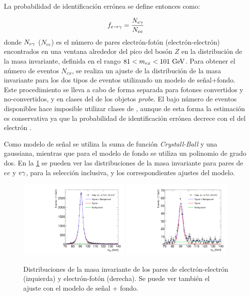 La probabilidad de identificación errónea {\feg} se define entonces como:

\begin{equation}\label{eq:efakerate}
  f_{e\rightarrow\gamma} = \frac{N_{e\gamma}}{N_{ee}}
\end{equation}
%
donde $N_{e\gamma}$ ($N_{ee}$) es el número de pares electrón-fotón
(electrón-electrón) encontrados en una ventana alrededor del pico del bosón $Z$ en la distribución de
la masa invariante, definida en el rango $81 < m_{ex} < 101 \gev$. Para obtener
el número de eventos $N_{ex}$, se realiza un ajuste de la distribución de la
masa invariante para los dos tipos de eventos utilizando un modelo de
señal+fondo. Este procedimiento se lleva a cabo de forma separada para fotones
convertidos y no-convertidos, y en clases del {\abseta} de los objetos
\emph{probe}. El bajo número de eventos disponibles hace imposible utilizar
clases de {\pt}, aunque de esta forma la estimación es conservativa ya que la
probabilidad de identificación errónea decrece con el {\pt} del electrón
\cite{Kuhl:1604846}.

Como modelo de señal se utiliza la suma de función \emph{Crystall-Ball} y una
gaussiana, mientras que para el modelo de fondo se utiliza un polinomio de grado
dos. En la \cref{fig:invmass_pairs} se pueden ver las distribuciones de la masa
invariante para pares de $ee$ y $e\gamma$, para la selección inclusiva, y los
correspondientes ajustes del modelo.

\begin{figure}[!h]
  \centering

  \includegraphics[width=0.49\textwidth]{figures/Fit_mee_efakes_Data_all}
  \includegraphics[width=0.49\textwidth]{figures/Fit_meg_efakes_Data_all}
  \caption{Distribuciones de la masa invariante de los pares de
    electrón-electrón (izquierda) y electrón-fotón (derecha). Se puede ver también el ajuste
    con el modelo de señal + fondo.}
  \label{fig:invmass_pairs}

\end{figure}

